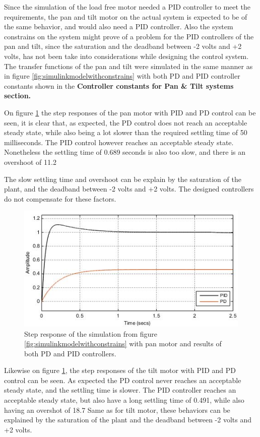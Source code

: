 Since the simulation of the load free motor needed a PID controller to meet the requirements, the pan and tilt motor on the actual system is expected to be of the same behavior, and would also need a PID controller. Also the system constrains on the system might prove of a problem for the PID controllers of the pan and tilt, since the saturation and the deadband between -2 volts and +2 volts, has not been take into considerations while designing the control system. The transfer functions of the pan and tilt were simulated in the same manner as in figure \ref{fig:simulinkmodelwithconstrains} with both PD and PID controller constants shown in the \textbf{Controller constants for Pan \& Tilt systems section.}

On figure \ref{fig:SimuStepTiltPDAndPID} the step responses of the pan motor with PID and PD control can be seen, it is clear that, as expected, the PD control does not reach an acceptable steady state, while also being a lot slower than the required settling time of 50 milliseconds. The PID control however reaches an acceptable steady state. Nonetheless the settling time of 0.689 seconds is also too slow, and there is an overshoot of 11.2%

The slow settling time and overshoot can be explain by the saturation of the plant, and the deadband between -2 volts and +2 volts. The designed controllers do not compensate for these factors. 

\begin{figure}[h!]
\centering
\includegraphics[scale=0.7]{Billeder/SimuStepPanPDAndPID.jpg}
\caption{ Step response of the simulation from figure \ref{fig:simulinkmodelwithconstrains} with pan motor and results of both PD and PID controllers.
 }
\label{fig:SimuStepTiltPDAndPID}
\end{figure}

Likewise on figure \ref{fig:SimuStepTiltPDAndPID}, the step responses of the tilt motor with PID and PD control can be seen. As expected the PD control never reaches an acceptable steady state, and the settling time is slower. The PID controller reaches an acceptable steady state, but also have a long settling time of 0.491, while also having an overshot of 18.7%
Same as for tilt motor, these behaviors can be explained by the saturation of the plant and the deadband between -2 volts and +2 volts.


